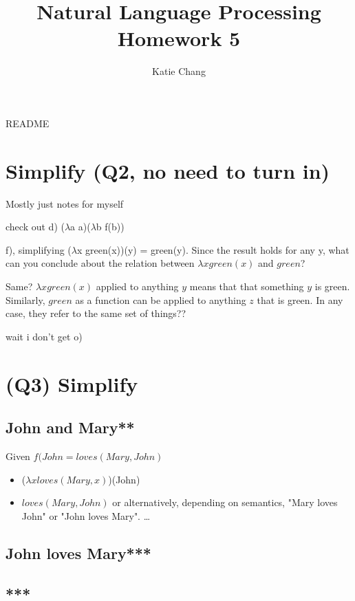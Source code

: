 \documentclass[12pt, letterpaper]{article}
\title{Natural Language Processing Homework 5}
\author{Katie Chang}
\begin{document}
\maketitle

README

\section{Simplify (Q2, no need to turn in)}
Mostly just notes for myself

check out d) ($\lambda$a a)($\lambda$b f(b))

f), simplifying ($\lambda$x green(x))(y) = green(y).
Since the result holds for any y, what can you conclude about the relation between $\lambda x green(x)$ and $green$?

Same? $\lambda x green(x)$ applied to anything $y$ means that that something $y$ is green. Similarly, $green$ as a function can be applied to anything $z$ that is green. In any case, they refer to the same set of things??

wait i don't get o)

\section{(Q3) Simplify}

\subsection{John and Mary**}
Given $f(John = loves(Mary, John)$

\begin{itemize}  
\item ($\lambda x loves(Mary,x)$)(John)
\item $loves(Mary, John)$ or alternatively, depending on semantics, "Mary loves John" or "John loves Mary".
\ldots 
\end{itemize}

\subsection{John loves Mary***}

\subsection{***}
\end{document}
